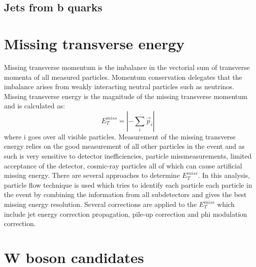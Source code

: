 
\subsection{Jets from b quarks}


\section{Missing transverse energy}

Missing transverse momentum is the imbalance in the vectorial sum of transverse momenta of all measured particles. Momentum conservation delegates that the imbalance arises from weakly interacting neutral particles such as neutrinos. Missing transverse energy is the magnitude of the missing transverse momentum and is calculated as:
\begin{equation}
E_T^{miss}= |-\sum_{i} \vec{p}_i|
\end{equation}
where i goes over all visible particles. Measurement of the missing transverse energy relies on the good measurement of all other particles in the event and as such is very sensitive to detector inefficiencies, particle missmeasurements, limited acceptance of the detector, cosmic-ray particles all of which can cause artificial missing energy. There are several approaches to determine $E_T^{miss}$. In this analysis, particle flow technique is used which tries to identify each particle each particle in the event by combining the information from all subdetectors and gives the best missing energy resolution.\cite{CMS-PAS-PFT-09-001,Chatrchyan:2011tn} Several corrections are applied to the $E_T^{miss}$ which include jet energy correction propagation, pile-up correction and phi modulation correction. 


\section{W boson candidates}


